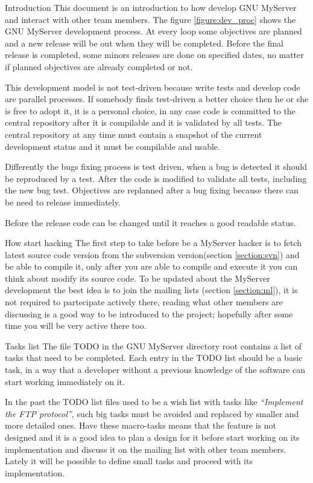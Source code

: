 \documentclass[12pt]{article}
\begin{document}
\begin{section}{Introduction}
This document is an introduction to how develop GNU MyServer and
interact with other team members.
The figure \ref{figure:dev_proc} shows the GNU MyServer development
process.
At every loop some objectives are planned and a new release will be
out when they will be completed.
Before the final release is completed, some minors releases are done
on specified dates, no matter if planned objectives are already
completed or not.

This development model is not test-driven because write tests and
develop code are parallel processes.
If somebody finds test-driven a better choice then he or she is free
to adopt it, it is a personal choice, in any case code is committed
to the central repository after it is compilable and it is validated
by all tests.
The central repository at any time must contain a snapshot of the
current development status and it must be compilable and usable.

Differently the bugs fixing process is test driven, when a bug is
detected it should be reproduced by a test.  After the code is
modified to validate all tests, including the new bug test.
Objectives are replanned after a bug fixing because there can be need
to release immediately.

Before the release code can be changed until it reaches a good
readable status.
\end{section}

\begin{section}{How start hacking}
The first step to take before be a MyServer hacker is to fetch latest
source code version from the subversion version(section
\ref{section:svn}) and be able to compile it, only after you are able
to compile and execute it you can think about modify its source code.
To be updated about the MyServer development the best idea is to join
the mailing lists (section \ref{section:ml}), it is not required to
partecipate actively there, reading what other members are discussing
is a good way to be introduced to the project; hopefully after some
time you will be very active there too.
\end{section}

\begin{section}{Tasks list}
The file TODO in the GNU MyServer directory root contains a list of
tasks that need to be completed.
Each entry in the TODO list should be a basic task, in a way that a
developer without a previous knowledge of the software can start
working immediately on it.

In the past the TODO list files used to be a wish list with tasks like
\textit{``Implement the FTP protocol''}, such big tasks must be
avoided and replaced by smaller and more detailed ones.
Have these macro-tasks means that the feature is not designed and it is
a good idea to plan a design for it before start working on its
implementation and discuss it on the mailing list with other team
members.
Lately it will be possible to define small tasks and proceed with its
implementation.
\end{section}
\end{document}
